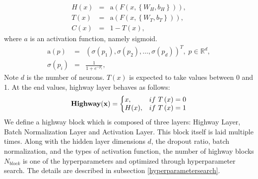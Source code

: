 \documentclass[useamsfonts]{pasj01}
\begin{document}
\begin{eqnarray}
    H \left(x\right) &=& \mathrm{a} \left( F \left(x, \left\{W_H, b_H\right\}\right) \right), \\
    T \left(x\right) &=& \mathrm{a} \left( F \left(x, \left\{W_T, b_T\right\}\right) \right), \\
    C \left(x\right) &=& 1 - T \left(x\right),
\end{eqnarray}
where $a$ is an activation function, namely sigmoid.
\begin{eqnarray*}
    \mathrm{a} \left(p\right) &=& \left( \sigma\left(p_1\right),\sigma\left(p_2\right), \ldots, \sigma\left(p_d\right) \right)^T, \; p \in \mathbb{R}^d, \\
    \sigma \left(p_i\right) &=& \frac{1}{1 + e^{-p_i}},
\end{eqnarray*}
Note $d$ is the number of neurons.  $T(x)$ is expected to take values between 0 and 1.  At the end values, highway layer behaves as follows:
\begin{equation}
    {\bf Highway(x)}=\left\{
    \begin{array}{@{}ll@{}}
      x, & \mathrm{if} \ T \left(x\right)= 0 \\
      H(x), & \mathrm{if} \ T \left(x\right)=1 
    \end{array}\right.
\end{equation}
We define a highway block which is composed of three layers: Highway Layer, Batch Normalization Layer and Activation Layer.
This block itself is laid multiple times.
Along with the hidden layer dimensions $d$, the dropout ratio, batch normalization, and the types of activation function, the number of highway blocks $N_{block}$ is one of the hyperparameters and optimized through hyperparameter search.   The details are described in subsection \ref{hyperparametersearch}.
\end{document}
